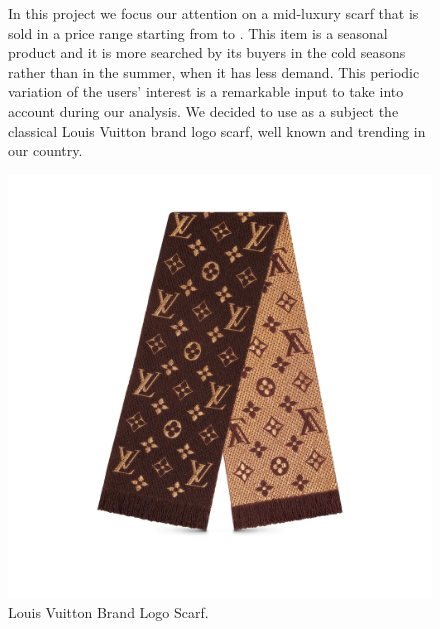 \begin{figure}[!htp] 
	\begin{flushleft}
		In this project we focus our attention on a mid-luxury scarf that is sold in a price range starting from  to . This item is a seasonal product and it is more searched by its buyers in the cold seasons rather than in the summer, when it has less demand. This periodic variation of the users' interest is a remarkable input to take into account during our analysis. We decided to use as a subject the classical Louis Vuitton brand logo scarf, well known and trending in our country.
	\end{flushleft}
	\centering
	\includegraphics[width=0.8\linewidth]{sections/images/productLogo}
	\caption{Louis Vuitton Brand Logo Scarf.}
\end{figure}
\clearpage